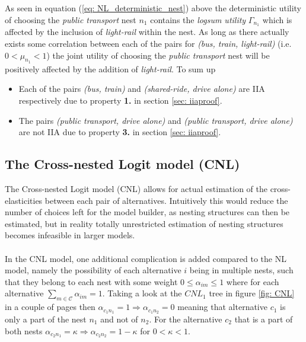 As seen in equation (\ref{eq: NL_deterministic_nest}) above the deterministic utility of choosing the \textit{public transport} nest $n_1$ contains the \textit{logsum utility} $\Gamma_{n_1}$ which is affected by the inclusion of \textit{light-rail} within the nest. As long as there actually exists some correlation between each of the pairs for \textit{(bus, train, light-rail)} (i.e. $0<\mu_{n_1}<1$) the joint utility of choosing the \textit{public transport} nest will be positively affected by the addition of \textit{light-rail}. To sum up
\begin{itemize}
  \item Each of the pairs \textit{(bus, train)} and \textit{(shared-ride, drive alone)} are IIA respectively due to property \textbf{1.} in section \ref{sec: iiaproof}.
  \item The pairs \textit{(public transport, drive alone)} and \textit{(public transport, drive alone)} are not IIA due to property \textbf{3.} in section \ref{sec: iiaproof}.
\end{itemize}

\subsection{The Cross-nested Logit model (CNL)}
The Cross-nested Logit model (CNL) allows for actual estimation of the cross-elasticities between each pair of alternatives. Intuitively this would reduce the number of choices left for the model builder, as nesting structures can then be estimated, but in reality totally unrestricted estimation of nesting structures becomes infeasible in larger models.
\\ \\
In the CNL model, one additional complication is added compared to the NL model, namely the possibility of each alternative $i$ being in multiple nests, such that they belong to each nest with some weight $0 \leq \alpha_{im} \leq1$ where for each alternative $\sum_{m\in\mathcal{C}}\alpha_{im}=1$. Taking a look at the $CNL_1$ tree in figure \ref{fig: CNL} in a couple of pages then $\alpha_{c_1n_1}=1\Rightarrow\alpha_{c_1n_2}=0$ meaning that alternative $c_1$ is only a part of the nest $n_1$ and not of $n_2$.
For the alternative $c_2$ that is a part of both nests $\alpha_{c_2n_1}=\kappa\Rightarrow\alpha_{c_2n_2}=1-\kappa$ for $0<\kappa<1$.

